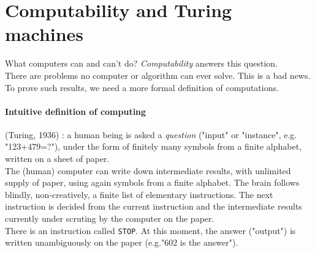 \documentclass[12pt,a4paper]{report}
\author{Kim Van Den Eeckhaut}
\theoremstyle{break}
\begin{document}
\section*{Computability and Turing machines}
What computers can and can't do? \emph{Computability} answers this question.\\
There are problems no computer or algorithm can ever solve. This is a bad news.\\
To prove such results, we need a more formal definition of computations.\\
\paragraph*{Intuitive definition of computing} (Turing, 1936) : a human being is asked a \emph{question} ("input" or "instance", e.g. "123+479=?"), under the form of finitely many symbols from a finite alphabet, written on a sheet of paper.\\
The (human) computer can write down intermediate results, with unlimited supply of paper, using again symbols from a finite alphabet. The brain follows blindly, non-creatively, a finite list of elementary instructions. The next instruction is decided from the current instruction and the intermediate results currently under scruting by the computer on the paper.\\
There is an instruction called \texttt{STOP}. At this moment, the answer ("output") is written unambiguously on the paper (e.g."602 is the answer").\\
\end{document}
